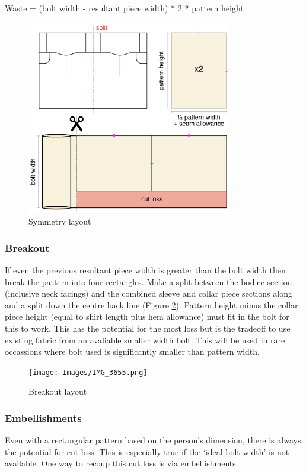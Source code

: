 Waste = (bolt width - resultant piece width) * 2 * pattern height
\begin{figure} [htb]
    \centering
    \includegraphics[width = 0.8\textwidth]{Images/symmetry layout.png}
    \caption{Symmetry layout}
    \label{fig:symmetry split}
\end{figure}

\subsubsection{Breakout}
If even the previous resultant piece width is greater than the bolt width then break the pattern into four rectangles. Make a split between the bodice section (inclusive neck facings) and the combined sleeve and collar piece sections along and a split down the centre back line (Figure \ref{fig:breakout}). Pattern height minus the collar piece height (equal to shirt length plus hem allowance) must fit in the bolt for this to work. This has the potential for the most loss but is the tradeoff to use existing fabric from an avaliable smaller width bolt. This will be used in rare occassions where bolt used is significantly smaller than pattern width.
\begin{figure} [H]
    \centering
    \texttt{[image: Images/IMG\_3655.png]}
    \caption{Breakout layout}
    \label{fig:breakout}
\end{figure}


\subsubsection{Embellishments}
Even with a rectangular pattern based on the person's dimension, there is always the potential for cut loss. This is especially true if the `ideal bolt width' is not available. One way to recoup this cut loss is via embellishments.

